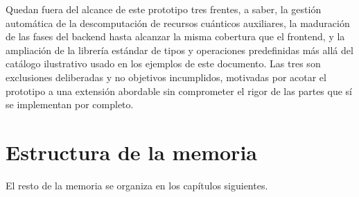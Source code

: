 Quedan fuera del alcance de este prototipo tres frentes, a saber, la gestión automática de la descomputación de recursos cuánticos auxiliares, la maduración de las fases del backend hasta alcanzar la misma cobertura que el frontend, y la ampliación de la librería estándar de tipos y operaciones predefinidas más allá del catálogo ilustrativo usado en los ejemplos de este documento. Las tres son exclusiones deliberadas y no objetivos incumplidos, motivadas por acotar el prototipo a una extensión abordable sin comprometer el rigor de las partes que sí se implementan por completo.

\section{Estructura de la memoria}
\label{sec:estructura-memoria}

El resto de la memoria se organiza en los capítulos siguientes.

